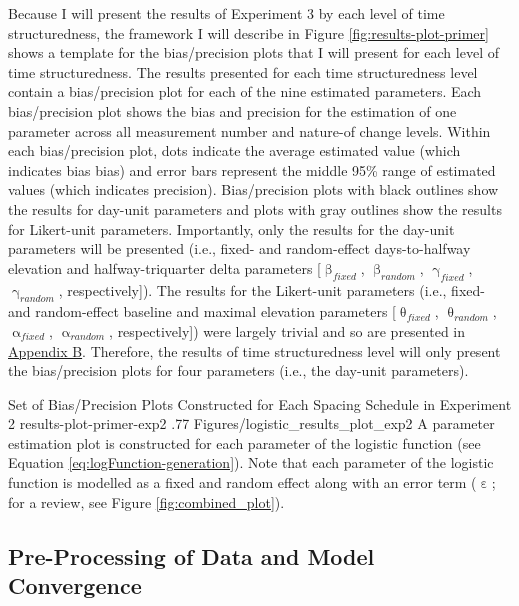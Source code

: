 \documentclass[
12pt, %
twoside,
english]{guelphthesis}
\begin{document}
Because I will present the results of Experiment 3 by each level of time structuredness, the framework I will describe in Figure \ref{fig:results-plot-primer} shows a template for the bias/precision plots that I will present for each level of time structuredness. The results presented for each time structuredness level contain a bias/precision plot for each of the nine estimated parameters. Each bias/precision plot shows the bias and precision for the estimation of one parameter across all measurement number and nature-of change levels. Within each bias/precision plot, dots indicate the average estimated value (which indicates bias bias) and error bars represent the middle 95\% range of estimated values (which indicates precision). Bias/precision plots with black outlines show the results for day-unit parameters and plots with gray outlines show the results for Likert-unit parameters. Importantly, only the results for the day-unit parameters will be presented (i.e., fixed- and random-effect days-to-halfway elevation and halfway-triquarter delta parameters {[}\(\upbeta_{fixed}\), \(\upbeta_{random}\), \(\upgamma_{fixed}\), \(\upgamma_{random}\), respectively{]}). The results for the Likert-unit parameters (i.e., fixed- and random-effect baseline and maximal elevation parameters {[}\(\uptheta_{fixed}\), \(\uptheta_{random}\), \(\upalpha_{fixed}\), \(\upalpha_{random}\), respectively{]}) were largely trivial and so are presented in \protect\hyperlink{appendix-b}{Appendix B}. Therefore, the results of time structuredness level will only present the bias/precision plots for four parameters (i.e., the day-unit parameters).
\begin{apaFigure}
[portrait]
[samepage]
[-0.2cm]
{Set of Bias/Precision Plots Constructed for Each Spacing Schedule in Experiment 2}
{results-plot-primer-exp2}
{.77}
{Figures/logistic_results_plot_exp2}
{A parameter estimation plot is constructed for each parameter of the logistic function (see Equation \ref{eq:logFunction-generation}). Note that each parameter of the logistic function is modelled as a fixed and random effect along with an error term ($\upepsilon$; for a review, see Figure \ref{fig:combined_plot}).}
\end{apaFigure}
\hypertarget{pre-processing-of-data-and-model-convergence-2}{%
\subsection{Pre-Processing of Data and Model Convergence}\label{pre-processing-of-data-and-model-convergence-2}}
\end{document}
